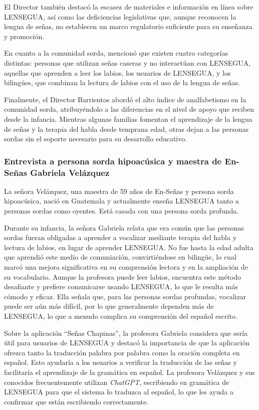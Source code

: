 El Director también destacó la escasez de materiales e información en línea sobre LENSEGUA, así como las deficiencias legislativas que, aunque reconocen la lengua de señas, no establecen un marco regulatorio suficiente para su enseñanza y promoción.

En cuanto a la comunidad sorda, mencionó que existen cuatro categorías distintas: personas que utilizan señas caseras y no interactúan con LENSEGUA, aquellas que aprenden a leer los labios, los usuarios de LENSEGUA, y los bilingües, que combinan la lectura de labios con el uso de la lengua de señas.

Finalmente, el Director Barrientos abordó el alto índice de analfabetismo en la comunidad sorda, atribuyéndolo a las diferencias en el nivel de apoyo que reciben desde la infancia. Mientras algunas familias fomentan el aprendizaje de la lengua de señas y la terapia del habla desde temprana edad, otras dejan a las personas sordas sin el soporte necesario para su desarrollo educativo.

\subsubsection{Entrevista a persona sorda hipoacúsica y maestra de En-Señas Gabriela Velázquez}
La señora Velázquez, una maestra de 59 años de En-Señas y persona sorda hipoacúsica, nació en Guatemala y actualmente enseña LENSEGUA tanto a personas sordas como oyentes. Está casada con una persona sorda profunda. 

Durante su infancia, la señora Gabriela relata que era común que las personas sordas fueran obligadas a aprender a vocalizar mediante terapia del habla y lectura de labios, en lugar de aprender LENSEGUA. No fue hasta la edad adulta que aprendió este medio de comuniación, convirtiéndose en bilingüe, lo cual marcó una mejora significativa en su comprensión lectora y en la ampliación de su vocabulario. Aunque la profesora puede leer labios, encuentra este método desafiante y prefiere comunicarse usando LENSEGUA, lo que le resulta más cómodo y eficaz. Ella señala que, para las personas sordas profundas, vocalizar puede ser aún más difícil, por lo que generalmente dependen más de LENSEGUA, lo que a menudo complica su comprensión del español escrito.

Sobre la aplicación ``Señas Chapinas'', la profesora Gabriela considera que sería útil para usuarios de LENSEGUA y destacó la importancia de que la aplicación ofrezca tanto la traducción palabra por palabra como la oración completa en español. Esto ayudaría a los usuarios a verificar la traducción de las señas y facilitaría el aprendizaje de la gramática en español. La profesora Velázquez y sus conocidos frecuentemente utilizan \textit{ChatGPT}, escribiendo en gramática de LENSEGUA para que el sistema lo traduzca al español, lo que les ayuda a confirmar que están escribiendo correctamente.

